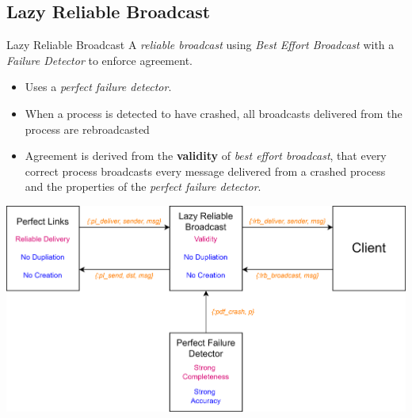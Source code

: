 \inputminted{elixir}{reliable_broadcast/code/eagre_reliable_broadcast.ex}

\subsection{Lazy Reliable Broadcast}
\begin{definitionbox}{Lazy Reliable Broadcast}
    A \textit{reliable broadcast} using \textit{Best Effort Broadcast} with a \textit{Failure Detector} to enforce agreement.
    \begin{itemize}
        \item Uses a \textit{perfect failure detector}.
        \item When a process is detected to have crashed, all broadcasts delivered from the process are rebroadcasted
        \item Agreement is derived from the \textbf{validity} of \textit{best effort broadcast}, that every correct process broadcasts every message delivered from a crashed process and the properties of the \textit{perfect failure detector}.
    \end{itemize}
\end{definitionbox}

\begin{center}
  \includegraphics[width=.8\textwidth]{reliable_broadcast/images/lazy_reliable_broadcast.drawio.png}
\end{center}

\inputminted{elixir}{reliable_broadcast/code/lazy_reliable_broadcast.ex}

